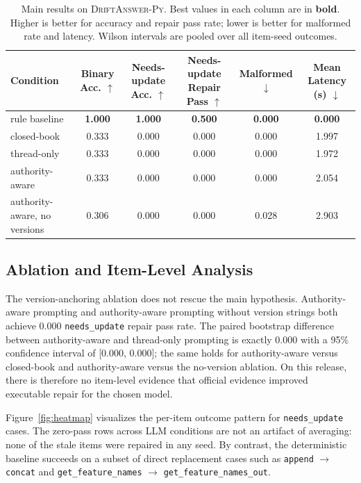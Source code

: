 \documentclass{article}
\newcommand{\dataset}{\textsc{DriftAnswer-Py}}
\newcommand{\needsupdate}{\texttt{needs\_update}}
\begin{document}
\begin{table}[t]
\caption{Main results on \dataset{}. Best values in each column are in \textbf{bold}. Higher is better for accuracy and repair pass rate; lower is better for malformed rate and latency. Wilson intervals are pooled over all item-seed outcomes.}
\label{tab:main-results}
\centering
\small
\begin{tabular}{lccccc}
\toprule
Condition & Binary Acc. $\uparrow$ & Needs-update Acc. $\uparrow$ & Needs-update Repair Pass $\uparrow$ & Malformed $\downarrow$ & Mean Latency (s) $\downarrow$ \\
\midrule
rule baseline & \textbf{1.000} & \textbf{1.000} & \textbf{0.500} & \textbf{0.000} & \textbf{0.000} \\
closed-book & 0.333 & 0.000 & 0.000 & 0.000 & 1.997 \\
thread-only & 0.333 & 0.000 & 0.000 & 0.000 & 1.972 \\
authority-aware & 0.333 & 0.000 & 0.000 & 0.000 & 2.054 \\
authority-aware, no versions & 0.306 & 0.000 & 0.000 & 0.028 & 2.903 \\
\bottomrule
\end{tabular}
\end{table}

\subsection{Ablation and Item-Level Analysis}

The version-anchoring ablation does not rescue the main hypothesis. Authority-aware prompting and authority-aware prompting without version strings both achieve 0.000 \needsupdate{} repair pass rate. The paired bootstrap difference between authority-aware and thread-only prompting is exactly 0.000 with a 95\% confidence interval of [0.000, 0.000]; the same holds for authority-aware versus closed-book and authority-aware versus the no-version ablation. On this release, there is therefore no item-level evidence that official evidence improved executable repair for the chosen model.

Figure~\ref{fig:heatmap} visualizes the per-item outcome pattern for \needsupdate{} cases. The zero-pass rows across LLM conditions are not an artifact of averaging: none of the stale items were repaired in any seed. By contrast, the deterministic baseline succeeds on a subset of direct replacement cases such as \texttt{append} $\rightarrow$ \texttt{concat} and \texttt{get\_feature\_names} $\rightarrow$ \texttt{get\_feature\_names\_out}.
\end{document}
